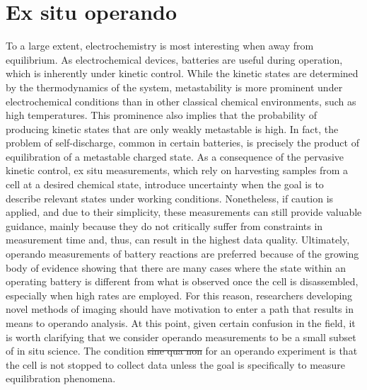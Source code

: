 \documentclass[journal=cmatex,manuscript=perspective]{achemso}
\providecommand{\DIFaddtex}[1]{{\protect\color{blue}\uwave{#1}}} %
\providecommand{\DIFdeltex}[1]{{\protect\color{red}\sout{#1}}}                      %
\providecommand{\DIFaddbegin}{} %
\providecommand{\DIFaddend}{} %
\providecommand{\DIFdelbegin}{} %
\providecommand{\DIFdelend}{} %
\providecommand{\DIFadd}[1]{\texorpdfstring{\DIFaddtex{#1}}{#1}} %
\providecommand{\DIFdel}[1]{\texorpdfstring{\DIFdeltex{#1}}{}} %
\begin{document}
\section{Ex situ  operando}

To a large extent, electrochemistry is most interesting when away from
equilibrium. As electrochemical devices, batteries are useful during
operation, which is inherently under kinetic control. While the
kinetic states are determined by the thermodynamics of the system,
metastability is more prominent under electrochemical conditions than
in other classical chemical environments, such as high
temperatures. This prominence also implies that the probability of
producing kinetic states that are only weakly metastable is high. In
fact, the problem of self-discharge, common in certain batteries, is
precisely the product of equilibration of a metastable charged
state. As a consequence of the pervasive kinetic control, ex situ
measurements, which rely on harvesting samples from a cell at a
desired chemical state, introduce uncertainty when the goal is to
describe relevant states under working conditions. Nonetheless, if
caution is applied, and due to their simplicity, these measurements
can still provide valuable guidance\cite{yu2015-2}, mainly because
they do not critically suffer from constraints in measurement time
and, thus, can result in the highest data quality. Ultimately,
operando measurements of battery reactions are preferred because of
the growing body of evidence showing that there are many cases where
the state within an operating battery is different from what is
observed once the cell is disassembled\cite{liu2014, lim2016},
especially when high rates are employed. For this reason, researchers
developing novel methods of imaging should have motivation to enter a
path that results in means to operando analysis. At this point, given
certain confusion in the field, it is worth clarifying that we
consider operando measurements to be a small subset of in situ
science. The condition \DIFdelbegin \DIFdel{sine qua non }\DIFdelend \DIFaddbegin \emph{\DIFadd{sine qua non}} \DIFaddend for an operando experiment
is that the cell is not stopped to collect data unless the goal is
specifically to measure equilibration phenomena.
\end{document}
